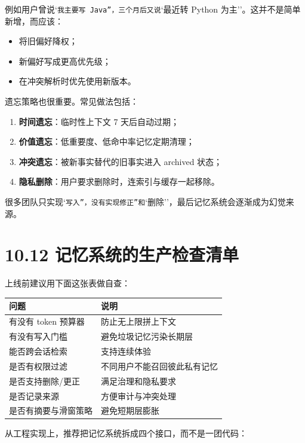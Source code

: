 例如用户曾说`\texttt{我主要写 Java''，三个月后又说}`最近转 Python 为主''。这并不是简单新增，而应该：


\begin{itemize}[leftmargin=2em]
\item 将旧偏好降权；
\item 新偏好写成更高优先级；
\item 在冲突解析时优先使用新版本。
\end{itemize}

遗忘策略也很重要。常见做法包括：


\begin{enumerate}[leftmargin=2em]
\item \textbf{时间遗忘}：临时性上下文 7 天后自动过期；
\item \textbf{价值遗忘}：低重要度、低命中率记忆定期清理；
\item \textbf{冲突遗忘}：被新事实替代的旧事实进入 archived 状态；
\item \textbf{隐私删除}：用户要求删除时，连索引与缓存一起移除。
\end{enumerate}

很多团队只实现`\texttt{写入''，没有实现}\texttt{修正''和}`删除''，最后记忆系统会逐渐成为幻觉来源。


\section{10.12 记忆系统的生产检查清单}

上线前建议用下面这张表做自查：


\begingroup
\scriptsize
\setlength{\tabcolsep}{3pt}
\begin{longtable}{|p{}|p{}|}
\hline
问题 & 说明 \\ \hline
有没有 token 预算器 & 防止无上限拼上下文 \\ \hline
有没有写入门槛 & 避免垃圾记忆污染长期层 \\ \hline
能否跨会话检索 & 支持连续体验 \\ \hline
是否有权限过滤 & 不同用户不能召回彼此私有记忆 \\ \hline
是否支持删除/更正 & 满足治理和隐私要求 \\ \hline
是否记录来源 & 方便审计与冲突处理 \\ \hline
是否有摘要与滑窗策略 & 避免短期层膨胀 \\ \hline
\end{longtable}
\endgroup

从工程实现上，推荐把记忆系统拆成四个接口，而不是一团代码：


